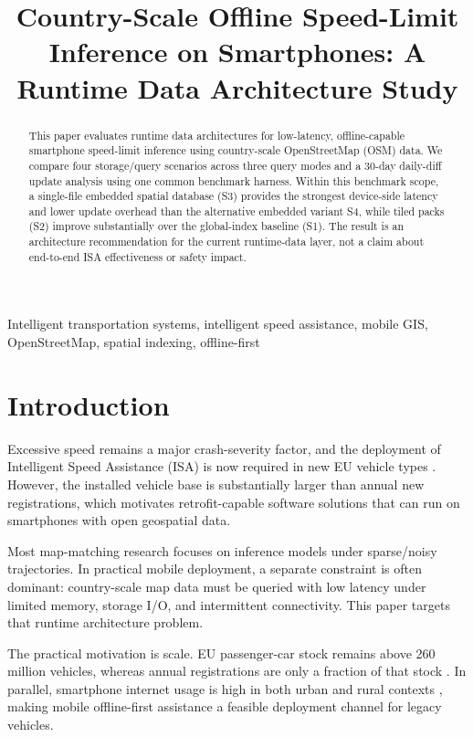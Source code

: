 \documentclass[conference]{IEEEtran}
\title{Country-Scale Offline Speed-Limit Inference on Smartphones: A Runtime Data Architecture Study}
\author{
\IEEEauthorblockN{Anonymous Authors}
\IEEEauthorblockA{Submission prepared for double-blind review}
}
\begin{document}
\maketitle

\begin{abstract}
This paper evaluates runtime data architectures for low-latency, offline-capable smartphone speed-limit inference using country-scale OpenStreetMap (OSM) data. We compare four storage/query scenarios across three query modes and a 30-day daily-diff update analysis using one common benchmark harness. Within this benchmark scope, a single-file embedded spatial database (S3) provides the strongest device-side latency and lower update overhead than the alternative embedded variant S4, while tiled packs (S2) improve substantially over the global-index baseline (S1). The result is an architecture recommendation for the current runtime-data layer, not a claim about end-to-end ISA effectiveness or safety impact.
\end{abstract}

\begin{IEEEkeywords}
Intelligent transportation systems, intelligent speed assistance, mobile GIS, OpenStreetMap, spatial indexing, offline-first
\end{IEEEkeywords}

\section{Introduction}
Excessive speed remains a major crash-severity factor, and the deployment of Intelligent Speed Assistance (ISA) is now required in new EU vehicle types \cite{eu2019_2144,eu2021_1958,eu_mandatory_safety_2024}. However, the installed vehicle base is substantially larger than annual new registrations, which motivates retrofit-capable software solutions that can run on smartphones with open geospatial data.

Most map-matching research focuses on inference models under sparse/noisy trajectories. In practical mobile deployment, a separate constraint is often dominant: country-scale map data must be queried with low latency under limited memory, storage I/O, and intermittent connectivity. This paper targets that runtime architecture problem.

The practical motivation is scale. EU passenger-car stock remains above 260 million vehicles, whereas annual registrations are only a fraction of that stock \cite{eurostat_passenger_cars_2026,acea_registrations_2024}. In parallel, smartphone internet usage is high in both urban and rural contexts \cite{eurostat_mobile_internet_2024}, making mobile offline-first assistance a feasible deployment channel for legacy vehicles.
\end{document}
